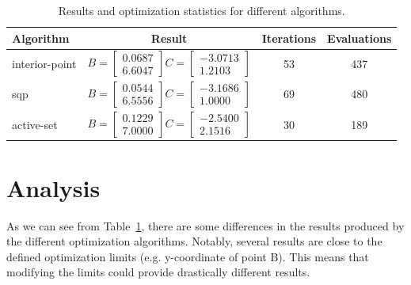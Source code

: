\documentclass{article}
\begin{document}
\begin{table}[htb]
	\centering
	\caption{Results and optimization statistics for different algorithms.\label{tab:results}}
	\begin{tabular}{|l|c|c|c|}
		\hline
		Algorithm & Result & Iterations & Evaluations\\
		\hline
		interior-point & $B = \begin{bmatrix} 0.0687 \\ 6.6047 \end{bmatrix} C = \begin{bmatrix} -3.0713 \\ 1.2103 \end{bmatrix}$ & 53 & 437\\
		sqp            & $B = \begin{bmatrix} 0.0544 \\ 6.5556 \end{bmatrix} C = \begin{bmatrix} -3.1686 \\ 1.0000 \end{bmatrix}$ & 69 & 480\\
		active-set     & $B = \begin{bmatrix} 0.1229 \\ 7.0000 \end{bmatrix} C = \begin{bmatrix} -2.5400 \\ 2.1516 \end{bmatrix}$ & 30 & 189\\
		\hline
	\end{tabular}
\end{table}

\section*{Analysis}
As we can see from Table~\ref*{tab:results}, there are some differences in the results produced by the different optimization algorithms. Notably, several results are close to the defined optimization limits (e.g. y-coordinate of point B). This means that modifying the limits could provide drastically different results.
\end{document}
